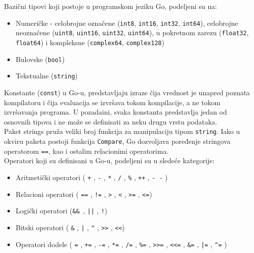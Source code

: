 \documentclass[12pt,oneside]{memoir}
\begin{document}
Bazični tipovi koji postoje u programskom jeziku Go, podeljeni su na:
\begin{itemize}

\item Numeričke -  celobrojne označene (\texttt{int8}, \texttt{int16}, \texttt{int32}, \texttt{int64}),
 celobrojne neoznačene  (\texttt{uint8}, \texttt{uint16}, \texttt{uint32}, \texttt{uint64}), u pokretnom zarezu (\texttt{float32}, \texttt{float64}) i kompleksne (\texttt{complex64}, \texttt{complex128})

\item Bulovske  (\texttt{bool})

\item Tekstualne (\texttt{string})

\end{itemize}

Konstante (\texttt{const}) u Go-u, predstavljaju izraze čija vrednost je unapred poznata kompilatoru i čija evaluacija se izvršava tokom kompilacije, a ne tokom izvršavanja programa. U pozadaini, svaka konstanta predstavlja jedan od osnovnih tipova i ne može se definisati za neku drugu vrstu podataka. 
\\

Paket strings pruža veliki broj funkcija za manipulaciju tipom \texttt{string}. Iako u okviru paketa postoji funkcija \texttt{Compare}, Go dozvoljava poređenje stringova operatorom \texttt{==}, kao i ostalim relacionimi operatorima.
\\

Operatori koji su definisani u Go-u, podeljeni su u sledeće kategorije:
\begin{itemize}

\item Aritmetički operatori ( \texttt{+} ,  \texttt{-} , \texttt{*} ,  \texttt{/} ,  \texttt{\%} ,  \texttt{++} ,   \texttt{- -} )
\item Relacioni operatori ( \texttt{==} ,  \texttt{!=} ,  \texttt{>} ,  \texttt{<} ,  \texttt{>=} ,  \texttt{<=})
\item Logički operatori (\texttt{\&\& },  \texttt{||} ,  \texttt{!})
\item Bitski operatori ( \texttt{\&} ,  \texttt{|} ,  \texttt{\^} ,  \texttt{>{}>} ,  \texttt{<{}<})
\item Operatori dodele ( \texttt{=} ,  \texttt{+=} ,  \texttt{-=} ,  \texttt{*=} ,  \texttt{/=} ,  \texttt{\%=} ,   \texttt{>{}>=} ,  \texttt{<{}<=} ,  \texttt{\&=} ,  \texttt{|=} ,  \texttt{\^{}=} )

\end{itemize}
\end{document}
